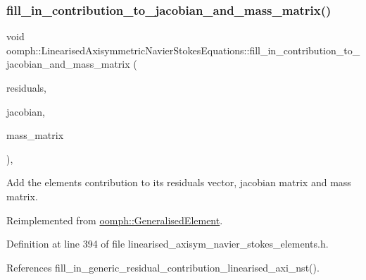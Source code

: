 \subsubsection{\texorpdfstring{fill\+\_\+in\+\_\+contribution\+\_\+to\+\_\+jacobian\+\_\+and\+\_\+mass\+\_\+matrix()}{fill\_in\_contribution\_to\_jacobian\_and\_mass\_matrix()}}
{\footnotesize\ttfamily void oomph\+::\+Linearised\+Axisymmetric\+Navier\+Stokes\+Equations\+::fill\+\_\+in\+\_\+contribution\+\_\+to\+\_\+jacobian\+\_\+and\+\_\+mass\+\_\+matrix (\begin{DoxyParamCaption}\item[{\hyperlink{classoomph_1_1Vector}{Vector}$<$ double $>$ \&}]{residuals,  }\item[{\hyperlink{classoomph_1_1DenseMatrix}{Dense\+Matrix}$<$ double $>$ \&}]{jacobian,  }\item[{\hyperlink{classoomph_1_1DenseMatrix}{Dense\+Matrix}$<$ double $>$ \&}]{mass\+\_\+matrix }\end{DoxyParamCaption})\hspace{0.3cm}{\ttfamily [inline]}, {\ttfamily [virtual]}}



Add the element\textquotesingle{}s contribution to its residuals vector, jacobian matrix and mass matrix. 



Reimplemented from \hyperlink{classoomph_1_1GeneralisedElement_a2b6294a730647cf865da94f2531466f8}{oomph\+::\+Generalised\+Element}.



Definition at line 394 of file linearised\+\_\+axisym\+\_\+navier\+\_\+stokes\+\_\+elements.\+h.



References fill\+\_\+in\+\_\+generic\+\_\+residual\+\_\+contribution\+\_\+linearised\+\_\+axi\+\_\+nst().

\mbox{\label{classoomph_1_1LinearisedAxisymmetricNavierStokesEquations_a0340774d1c5ceb93b90f037be3e44f3b}} 
